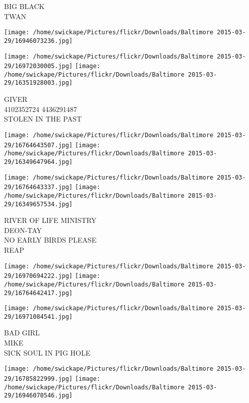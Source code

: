 \documentclass[10pt,letterpaper]{article}
\begin{document}
BIG BLACK\\
TWAN\\
\pagebreak

\texttt{[image: /home/swickape/Pictures/flickr/Downloads/Baltimore 2015-03-29/16946073236.jpg]}

\vspace{0.25in}
\texttt{[image: /home/swickape/Pictures/flickr/Downloads/Baltimore 2015-03-29/16972030005.jpg]}
\texttt{[image: /home/swickape/Pictures/flickr/Downloads/Baltimore 2015-03-29/16351928003.jpg]}

GIVER\\
4102352724 4436291487\\
STOLEN IN THE PAST\\
\pagebreak

\texttt{[image: /home/swickape/Pictures/flickr/Downloads/Baltimore 2015-03-29/16764643507.jpg]}
\texttt{[image: /home/swickape/Pictures/flickr/Downloads/Baltimore 2015-03-29/16349647964.jpg]}

\texttt{[image: /home/swickape/Pictures/flickr/Downloads/Baltimore 2015-03-29/16764643337.jpg]}
\texttt{[image: /home/swickape/Pictures/flickr/Downloads/Baltimore 2015-03-29/16349657534.jpg]}

RIVER OF LIFE MINISTRY\\
DEON{-}TAY\\
NO EARLY BIRDS PLEASE\\
REAP\\
\pagebreak

\texttt{[image: /home/swickape/Pictures/flickr/Downloads/Baltimore 2015-03-29/16970694222.jpg]}
\texttt{[image: /home/swickape/Pictures/flickr/Downloads/Baltimore 2015-03-29/16764642417.jpg]}

\vspace{0.25in}
\texttt{[image: /home/swickape/Pictures/flickr/Downloads/Baltimore 2015-03-29/16971084541.jpg]}

BAD GIRL\\
MIKE\\
SICK SOUL IN PIG HOLE\\
\pagebreak

\texttt{[image: /home/swickape/Pictures/flickr/Downloads/Baltimore 2015-03-29/16785822999.jpg]}
\texttt{[image: /home/swickape/Pictures/flickr/Downloads/Baltimore 2015-03-29/16946070546.jpg]}
\end{document}
